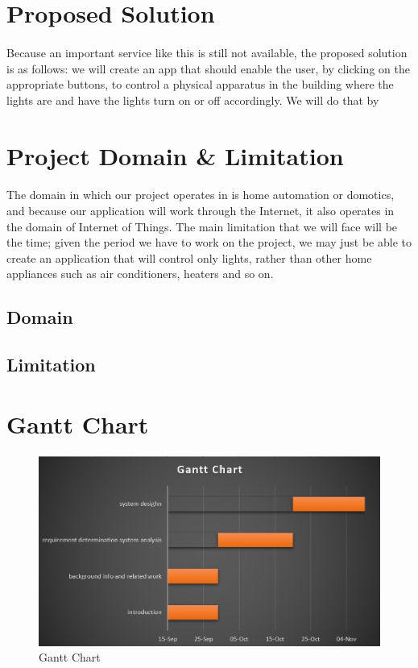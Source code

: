 \documentclass[a4paper, 12pt, oneside]{book}
\begin{document}
		\section{Proposed Solution}
		\paragraph{}Because an important service like this is still not available, the proposed solution is as follows: we will create an app that should enable the user, by clicking on the appropriate buttons, to control a physical apparatus in the building where the lights are and have the lights turn on or off accordingly. We will do that by
		\section{Project Domain \& Limitation}
\paragraph{}The domain in which our project operates in is home automation or domotics, and because our application will work through the Internet, it also operates in the domain of Internet of Things. 
The main limitation that we will face will be the time; given the period we have to work on the project, we may just be able to create an application that will control only lights, rather than other home appliances such as air conditioners, heaters and so on. 
			\subsection{Domain}
			\subsection{Limitation}
		\section{Gantt Chart}
		\begin{figure}[h!]
  			\caption{Gantt Chart}
			\includegraphics[width=\linewidth]{img/gantt_chart.png}
		\end{figure}
		\newpage	
\end{document}
